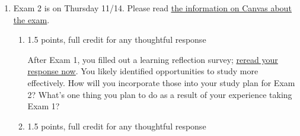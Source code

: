 \documentclass{article}
\makeatletter
\let\@href=\href
\renewcommand{\href}[2]{\@href{#1}{\ul{#2}}}
\makeatother
\begin{document}
\begin{enumerate}
\begin{enumerate}
    \begin{solution}
      We know that $M'(t)=\frac{1}{40}M(t)=0.025M(t)$, so that rules out (ii) and (iv).
      Since we know that $M(0)=3000$, that rules out (iii), leaving us with . 
    \end{solution}

  \item

    \begin{grading}
      1 point
    \end{grading}

    \begin{problem}[\nstretch{0.5}]
      Since $M(t)$ is an exponential function, it can be written as $C \cdot b^t$ for some constants $C$ and $b$. What are the values of $C$ and $b$? 
    \end{problem}

    \begin{solution}
      $M(t)=3000e^{0.025t}$. Based on this, .
    \end{solution}

  \end{enumerate}
\item  Exam 2 is on Thursday 11/14. Please read \href{https://canvas.harvard.edu/courses/138327/pages/exams}{the information on Canvas about the exam}.

  \begin{enumerate}
  \item

    \begin{grading}
      1.5 points, full credit for any thoughtful response
    \end{grading}

    \begin{problem}[\stretch{0.25}]
      After Exam 1, you filled out a learning reflection survey; \href{https://forms.gle/gZoESAGCsZBYJ3VC9}{reread your response now}. You likely identified opportunities to study more effectively. How will you incorporate those into your study plan for Exam 2? What's one thing you plan to do as a result of your experience taking Exam 1?
    \end{problem}

  \item

    \begin{grading}
      1.5 points, full credit for any thoughtful response
    \end{grading}


\end{enumerate}
\end{enumerate}
\end{document}
